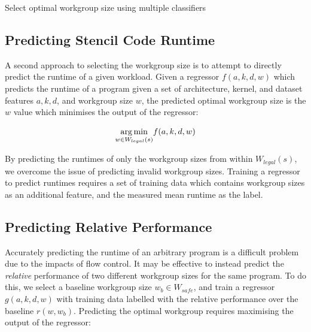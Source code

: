 \begin{algorithm}

\caption{Select optimal workgroup size using multiple classifiers}
\label{alg:autotune-classification2}
\end{algorithm}



\subsection{Predicting Stencil Code Runtime}

 A second approach to selecting the
workgroup size is to attempt to directly predict the runtime of a
given workload. Given a regressor $f(a,k,d,w)$ which predicts the
runtime of a program given a set of architecture, kernel, and dataset
features $a,k,d$, and workgroup size $w$, the predicted optimal
workgroup size is the $w$ value which minimises the output of the
regressor:

\begin{equation}
  \underset{w \in W_{legal}(s)}{\operatorname*{arg\,min}} f(a,k,d,w)
\end{equation}

By predicting the runtimes of only the workgroup sizes from within
$W_{legal}(s)$, we overcome the issue of predicting invalid workgroup
sizes. Training a regressor to predict runtimes requires a set of
training data which contains workgroup sizes as an additional feature,
and the measured mean runtime as the label.

% 

\subsection{Predicting Relative Performance}

Accurately predicting the runtime of an arbitrary program is a
difficult problem due to the impacts of flow control. It may be
effective to instead predict the \emph{relative} performance of two
different workgroup sizes for the same program. To do this, we select
a baseline workgroup size $w_b \in W_{safe}$, and train a regressor
$g(a,k,d,w)$ with training data labelled with the relative performance
over the baseline $r(w, w_b)$. Predicting the optimal workgroup
requires maximising the output of the regressor:


